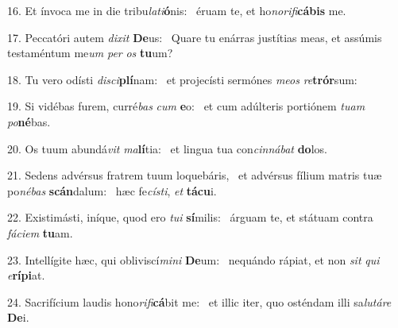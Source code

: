 16. Et ínvoca me in die tribu\textit{la}\textit{ti}\textbf{ó}nis: \ast\  éruam te, et ho\textit{no}\textit{ri}\textit{fi}\textbf{cá}\textbf{bis} me.\

17. Peccatóri autem \textit{di}\textit{xit} \textbf{De}us: \ast\  Quare tu enárras justítias meas, et assúmis testaméntum me\textit{um} \textit{per} \textit{os} \textbf{tu}um?\

18. Tu vero odísti \textit{di}\textit{sci}\textbf{plí}nam: \ast\  et projecísti sermónes \textit{me}\textit{os} \textit{re}\textbf{trór}sum:\

19. Si vidébas furem, curré\textit{bas} \textit{cum} \textbf{e}o: \ast\  et cum adúlteris portiónem \textit{tu}\textit{am} \textit{po}\textbf{né}bas.\

20. Os tuum abundá\textit{vit} \textit{ma}\textbf{lí}tia: \ast\  et lingua tua con\textit{cin}\textit{ná}\textit{bat} \textbf{do}los.\

21. Sedens advérsus fratrem tuum loquebáris, \dag\  et advérsus fílium matris tuæ po\textit{né}\textit{bas} \textbf{scán}dalum: \ast\  hæc fe\textit{cís}\textit{ti}, \textit{et} \textbf{tá}\textbf{cu}i.\

22. Existimásti, iníque, quod ero \textit{tu}\textit{i} \textbf{sí}milis: \ast\  árguam te, et státuam contra \textit{fá}\textit{ci}\textit{em} \textbf{tu}am.\

23. Intellígite hæc, qui obliviscí\textit{mi}\textit{ni} \textbf{De}um: \ast\  nequándo rápiat, et non \textit{sit} \textit{qui} \textit{e}\textbf{rí}\textbf{pi}at.\

24. Sacrifícium laudis hono\textit{ri}\textit{fi}\textbf{cá}bit me: \ast\  et illic iter, quo osténdam illi sa\textit{lu}\textit{tá}\textit{re} \textbf{De}i.\


